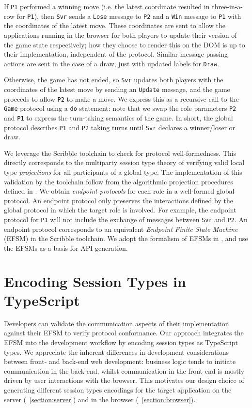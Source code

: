 \documentclass[submission,copyright,creativecommons]{eptcs}
\newcommand{\sectionref}[1]{\textsection~\ref{#1}}
\begin{document}
If \texttt{P1} performed a winning move (i.e. the latest coordinate resulted in three-in-a-row for \texttt{P1}), then \texttt{Svr} sends a \texttt{Lose} message to \texttt{P2} and a \texttt{Win} message to \texttt{P1} with the coordinates of the latest move. These coordinates are sent to allow the applications running in the browser for both players to update their version of the game state respectively; how they choose to render this on the DOM is up to their implementation, independent of the protocol. Similar message passing actions are sent in the case of a draw, just with updated labels for \texttt{Draw}. 

Otherwise, the game has not ended, so \texttt{Svr} updates both players with the coordinates of the latest move by sending an \texttt{Update} message, and the game proceeds to allow \texttt{P2} to make a move. We express this as a recursive call to the \texttt{Game} protocol using a \texttt{do} statement: note that we swap the role parameters \texttt{P2} and \texttt{P1} to express the turn-taking semantics of the game. In short, the global protocol describes \texttt{P1} and \texttt{P2} taking turns until \texttt{Svr} declares a winner/loser or draw.

We leverage the Scribble toolchain to check for protocol well-formedness. This directly corresponds to the multiparty session type theory of verifying valid local type \textit{projections} for all participants of a global type. The implementation of this validation by the toolchain follow from the algorithmic projection procedures defined in \cite{MPST}. We obtain \textit{endpoint protocols} for each role in a well-formed global protocol. An endpoint protocol only preserves the interactions defined by the global protocol in which the target role is involved. For example, the endpoint protocol for \texttt{P1} will not include the exchange of messages between \texttt{Svr} and \texttt{P2}. An endpoint protocol corresponds to an equivalent \textit{Endpoint Finite State Machine} (EFSM) in the Scribble toolchain. We adopt the formalism of EFSMs in \cite{Hybrid2016}, and use the EFSMs as a basis for API generation.


\section{Encoding Session Types in TypeScript}

Developers can validate the communication aspects of their implementation against their EFSM to verify protocol conformance. Our approach integrates the EFSM into the development workflow by encoding session types as TypeScript types. We appreciate the inherent differences in development considerations between front- and back-end web development: business logic tends to initiate communication in the back-end, whilst communication in the front-end is mostly driven by user interactions with the browser. This motivates our design choice of generating different session types encodings for the target application on the server (\sectionref{section:server}) and in the browser (\sectionref{section:browser}).
\end{document}
